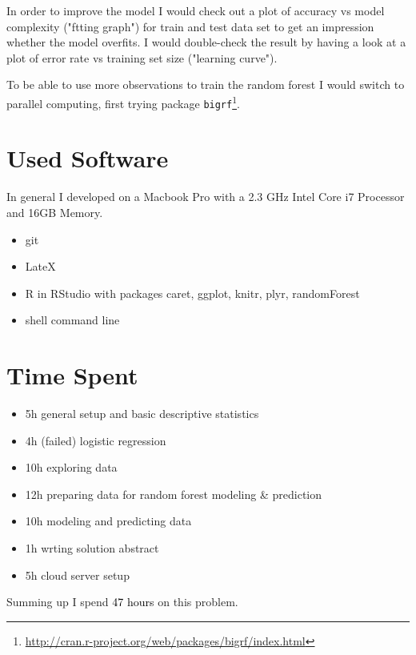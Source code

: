 \documentclass{article}\usepackage[]{graphicx}\usepackage[]{color}
\begin{document}
In order to improve the model I would check out a plot of accuracy vs model complexity ("ftting graph") for train and test data set to get an impression whether the model overfits. I would double-check the result by having a look at a plot of error rate vs training set size ("learning curve").

To be able to use more observations to train the random forest I would switch to parallel computing, first trying package \verb+bigrf+\footnote{\url{http://cran.r-project.org/web/packages/bigrf/index.html}}.




\section{Used Software}
\label{used_software}
In general I developed on a Macbook Pro with a 2.3 GHz Intel Core i7 Processor and 16GB Memory.

\begin{itemize}
	\item git
	\item LateX
	\item R in RStudio with packages caret, ggplot, knitr, plyr, randomForest
	\item shell command line
\end{itemize}

\section{Time Spent}
\begin{itemize}
	\item 5h general setup and basic descriptive statistics
	\item 4h (failed) logistic regression
	\item 10h exploring data
	\item 12h preparing data for random forest modeling \& prediction
	\item 10h modeling and predicting data
	\item 1h wrting solution abstract 
	\item 5h cloud server setup
\end{itemize}

Summing up I spend \textcolor{black}{47 hours} on this problem.
\end{document}
